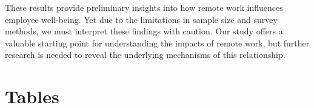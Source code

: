 \documentclass[12pt]{article}
\begin{document}
These results provide preliminary insights into how remote work influences employee well-being. Yet due to the limitations in sample size and survey methods, we must interpret these findings with caution. Our study offers a valuable starting point for understanding the impacts of remote work, but further research is needed to reveal the underlying mechanisms of this relationship.



{}




\newpage

\section*{Tables}
\end{document}
